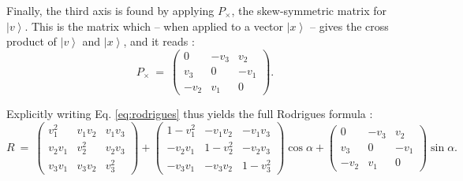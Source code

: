Finally, the third axis is found by applying $P_{\times}$, the skew-symmetric matrix for $\left|v\right>$.
This is the matrix which -- when applied to a vector $\left|x\right>$ -- gives the cross product of $\left|v\right>$ and $\left|x\right>$, 
and it reads \cite{wiki_skewsymm}:
\begin{equation}
	P_{\times} \ =\ 
		\left( \begin{array}{ccc} 
			0     & -v_3 &  v_2 \\
			v_3   & 0    & -v_1 \\
			-v_2  & v_1  & 0
		\end{array} \right).
\end{equation}

Explicitly writing Eq. \ref{eq:rodrigues} thus yields the full Rodrigues formula \cite[p. 718, p. 816]{Arens2015}:
\begin{equation}
	R \ = \ 
		\left( \begin{array}{ccc} 
			v_1^2   &    v_1 v_2 &       v_1 v_3 \\
			v_2 v_1 &      v_2^2 &       v_2 v_3 \\
			v_3 v_1 &    v_3 v_2 &         v_3^2
		\end{array} \right)
	+ 	\left( \begin{array}{ccc} 
			1 - v_1^2    &      - v_1 v_2 &         - v_1 v_3 \\
			   - v_2 v_1 &      1 - v_2^2 &         - v_2 v_3 \\
			   - v_3 v_1 &      - v_3 v_2 &         1 - v_3^2
		\end{array} \right)
		\cos \alpha 
	 + 
		\left( \begin{array}{ccc} 
			0     & -v_3 &  v_2 \\
			v_3   & 0    & -v_1 \\
			-v_2  & v_1  & 0
		\end{array} \right)
		\sin \alpha.
	\label{eq:rodrigues}
\end{equation}

